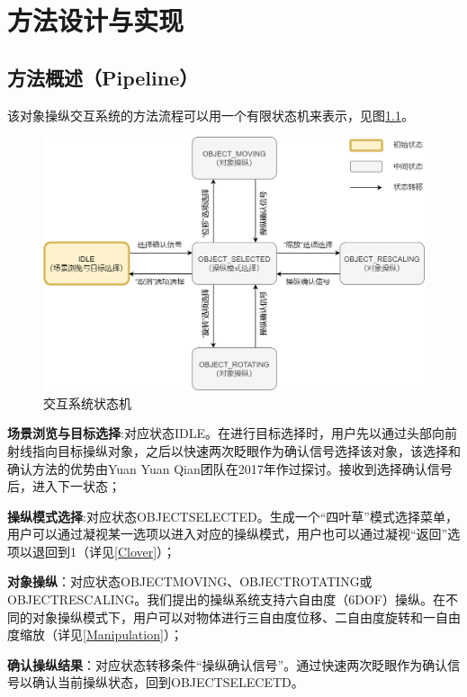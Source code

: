 
\chapter{方法设计与实现}

\section{方法概述（Pipeline）}

该对象操纵交互系统的方法流程可以用一个有限状态机来表示，见图\ref{fig-3-1}。

\begin{figure}[b!]
    \centering
    \includegraphics[width=.85\textwidth]{figure/system_state_machine.png}
    \caption{交互系统状态机}
    \label{fig-3-1}
\end{figure}

{\bf 场景浏览与目标选择}:对应状态IDLE。在进行目标选择时，用户先以通过头部向前射线指向目标操纵对象，之后以快速两次眨眼作为确认信号选择该对象，该选择和确认方法的优势由Yuan Yuan Qian团队在2017年作过探讨。接收到选择确认信号后，进入下一状态；

{\bf 操纵模式选择}:对应状态OBJECT\us SELECTED。生成一个“四叶草”模式选择菜单，用户可以通过凝视某一选项以进入对应的操纵模式，用户也可以通过凝视“返回”选项以退回到1（详见\autoref{Clover}）；

{\bf 对象操纵}：对应状态OBJECT\us MOVING、OBJECT\us ROTATING或OBJECT\us RESCALING。我们提出的操纵系统支持六自由度（6DOF）操纵。在不同的对象操纵模式下，用户可以对物体进行三自由度位移、二自由度旋转和一自由度缩放（详见\autoref{Manipulation}）；

{\bf 确认操纵结果}：对应状态转移条件“操纵确认信号”。通过快速两次眨眼作为确认信号以确认当前操纵状态，回到OBJECT\us SELECETD。

